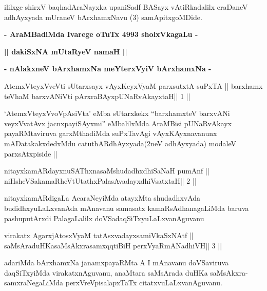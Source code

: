 \begin{center}
ililxge shirxV baqhadAraNayxka upaniSadf BASayx vAtiRkadalilx eraDaneV
adhAyxyada mUraneV bArxhamxNavu (3) samApitxgoMDide.
\end{center}

\begin{center}
\textbf{- AraMBadiMda Ivarege oTuTx 4993 sholxVkagaLu -}
\end{center}

\begin{center}
\textbf{|| dakiSxNA mUtaRyeV namaH ||}

\textbf{- nAlakxneV bArxhamxNa meYterxVyiV bArxhamxNa -}
\end{center}

\begin{shl}
AtemxVteyxVveVti sUtarxsayx vAyxKeyxVyaM parxsutxtA suPxTA ||
barxhamx teV\s haM barxvANiVti pArxraBAyx\s\s pUNaRvAkayxtaH\hfill || 1 ||
\end{shl}

\begin{artha}
`AtemxVteyxVvoVpAsiVta' eMba sUtarxkekx ``barxhamxteV barxvANi
  veyxVvatAvx jacnxpayiSAyxmi'' eMbalilxMda AraMBisi pUNaRvAkayx
  payaRMtaviruva garxMthadiMda suPxTavAgi vAyxKAyxnavanunx
  mADatakakxdedxMdu catuthARdhAyxyada(2neV adhAyxyada) modaleV
  parxsAtxpiside ||
\end{artha}


\begin{shl}
nitayxkamARdayxnuSAThxnasaMshudadhxdhiSaNaH pumAnf ||
niHsheVSakamaRheVtUtathxPalasAvadayxdhiVsatxtaH\hfill || 2 ||
\end{shl}

\begin{artha}
nitayxkamARdigaLa AcaraNeyiMda atayxMta shudadhxvAda
budidhxyuLaLxvanAda mAnavanu samasatx kamaRsAdhanagaLiMda baruva
pashuputArxdi PalagaLalilx doVSadaqSiTxyuLaLxvanAguvanu 
\end{artha}

\begin{shl}
virakatx AgarxjAtosxV\s yaM tatAsxvadayxsamiVkaSxNAtf ||
saMsAraduHKasaMsAkxrasamxqqtiBiH perxVyaRmANadhiVH\hfill || 3 ||
\end{shl}

\begin{artha}
adariMda bArxhamxNa janamxpayaRMta A I mAnavanu doVSaviruva
daqSiTxyiMda virakatxnAguvanu, anaMtara saMsArada duHKa
saMsAkxra-samxraNegaLiMda perxVreVpisalapxTaTx citatxvuLaLxvanAguvanu. 
\end{artha}

